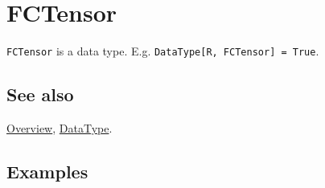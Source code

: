 \documentclass[../FeynCalcManual.tex]{subfiles}
\begin{document}
\hypertarget{fctensor}{%
\section{FCTensor}\label{fctensor}}

\texttt{FCTensor} is a data type. E.g.
\texttt{DataType[\allowbreak{}R,\ \allowbreak{}FCTensor] = True}.

\subsection{See also}

\hyperlink{toc}{Overview}, \hyperlink{datatype}{DataType}.

\subsection{Examples}
\end{document}
